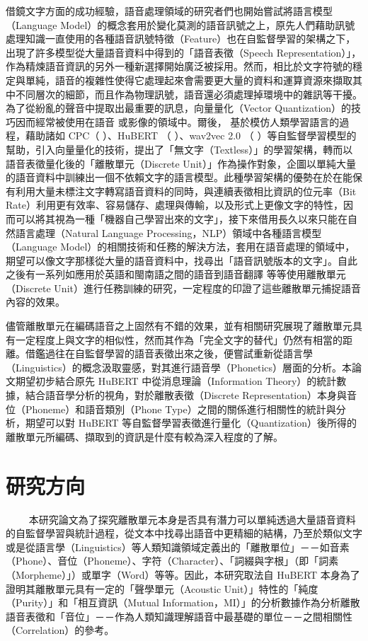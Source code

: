借鏡文字方面的成功經驗，語音處理領域的研究者們也開始嘗試將語言模型（Language Model）的概念套用於變化莫測的語音訊號之上，原先人們藉助訊號處理知識一直使用的各種語音訊號特徵（Feature）也在自監督學習的架構之下，出現了許多模型從大量語音資料中得到的「語音表徵（Speech Representation）」，作為精煉語音資訊的另外一種新選擇開始廣泛被採用。然而，相比於文字符號的穩定與單純，語音的複雜性使得它處理起來會需要更大量的資料和運算資源來擷取其中不同層次的細節，而且作為物理訊號，語音還必須處理掉環境中的雜訊等干擾。為了從紛亂的聲音中提取出最重要的訊息，向量量化（Vector Quantization）的技巧因而經常被使用在語音 \cite{chorowski2019unsupervised, Chen2023vector, Zhao2023speech} 或影像的領域中。爾後， \cite{lakhotia2021generative}  基於模仿人類學習語言的過程，藉助諸如 CPC（\cite{oord2019representation} ）、HuBERT （\cite{hsu2021hubert} ）、wav2vec 2.0 （\cite{baevski2020wav2vec} ）等自監督學習模型的幫助，引入向量量化的技術，提出了「無文字（Textless）」的學習架構，轉而以語音表徵量化後的「離散單元（Discrete Unit）」作為操作對象，企圖以單純大量的語音資料中訓練出一個不依賴文字的語言模型。此種學習架構的優勢在於在能保有利用大量未標注文字轉寫語音資料的同時，與連續表徵相比資訊的位元率（Bit Rate）利用更有效率、容易儲存、處理與傳輸，以及形式上更像文字的特性，因而可以將其視為一種「機器自己學習出來的文字」，接下來借用長久以來只能在自然語言處理（Natural Language Processing，NLP）領域中各種語言模型（Language Model）的相關技術和任務的解決方法，套用在語音處理的領域中，期望可以像文字那樣從大量的語音資料中，找尋出「語音訊號版本的文字」。自此之後有一系列如應用於英語和閩南語之間的語音到語音翻譯 \cite{chen2023speech} 等等使用離散單元（Discrete Unit）進行任務訓練的研究，一定程度的印證了這些離散單元捕捉語音內容的效果。

儘管離散單元在編碼語音之上固然有不錯的效果，並有相關研究展現了離散單元具有一定程度上與文字的相似性，然而其作為「完全文字的替代」仍然有相當的距離。借鑑過往在自監督學習的語音表徵出來之後，便嘗試重新從語言學（Linguistics）的概念汲取靈感，對其進行語音學（Phonetics）層面的分析。本論文期望初步結合原先 HuBERT 中從消息理論（Information Theory）的統計數據，結合語音學分析的視角，對於離散表徵（Discrete Representation）本身與音位（Phoneme）和語音類別（Phone Type）之間的關係進行相關性的統計與分析，期望可以對 HuBERT 等自監督學習表徵進行量化（Quantization）後所得的離散單元所編碼、擷取到的資訊是什麼有較為深入程度的了解。

    
\section{研究方向}
　　
本研究論文為了探究離散單元本身是否具有潛力可以單純透過大量語音資料的自監督學習與統計過程，從文本中找尋出語音中更精細的結構，乃至於類似文字或是從語言學（Linguistics）等人類知識領域定義出的「離散單位」－－如音素（Phone）、音位（Phoneme）、字符（Character）、「詞綴與字根」（即「詞素（Morpheme）」）或單字（Word）等等。因此，本研究取法自 HuBERT 本身為了證明其離散單元具有一定的「聲學單元（Acoustic Unit）」特性的「純度（Purity）」和「相互資訊（Mutual Information，MI）」的分析數據作為分析離散語音表徵和「音位」－－作為人類知識理解語音中最基礎的單位－－之間相關性（Correlation）的參考。


